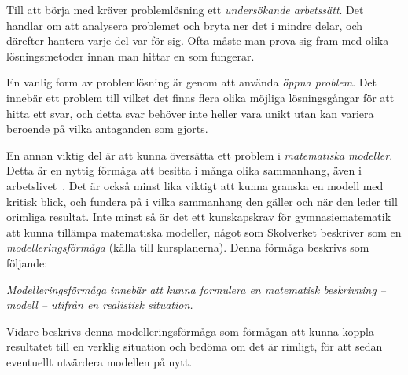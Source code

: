 \textcolor{lila}{
    Till att börja med kräver problemlösning ett \textsl{undersökande arbetssätt}. Det handlar om att analysera problemet och bryta ner det i mindre delar, och därefter hantera varje del var för sig. Ofta måste man prova sig fram med olika lösningsmetoder innan man hittar en som fungerar.
}
        
\textcolor{lila}{
    En vanlig form av problemlösning är genom att använda \textsl{öppna problem}. Det innebär ett  problem till vilket det finns flera olika möjliga lösningsgångar för att hitta ett svar, och detta svar behöver inte heller vara unikt utan kan variera beroende på vilka antaganden som gjorts.
}

\textcolor{lila}{
    En annan viktig del är att kunna översätta ett problem i \textsl{matematiska modeller}. Detta är en nyttig förmåga att besitta i många olika sammanhang, även i arbetslivet~\cite{TheElephant}. Det är också minst lika viktigt att kunna granska en modell med kritisk blick, och fundera på i vilka sammanhang den gäller och när den leder till orimliga resultat.
}
\textcolor{Mahogany}{Inte minst så är det ett kunskapskrav för gymnasiematematik att kunna tillämpa matematiska modeller, något som Skolverket beskriver som en \textsl{modelleringsförmåga} \cite{ProblemDef} (källa till kursplanerna). Denna förmåga beskrivs som följande:}

\begin{displayquote}
    \textcolor{Mahogany}{
        \textsl{Modelleringsförmåga innebär att kunna formulera en matematisk beskrivning – modell – utifrån en realistisk situation.}
    }
\end{displayquote}
\noindent\textcolor{Mahogany}{Vidare beskrivs denna modelleringsförmåga som förmågan att kunna koppla resultatet till en verklig situation och bedöma om det är rimligt, för att sedan eventuellt utvärdera modellen på nytt.}

